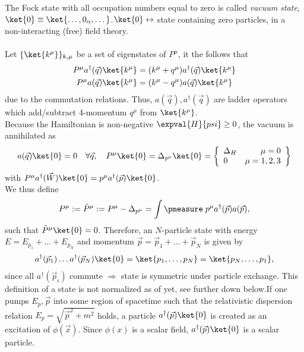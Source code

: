 The Fock state with all occupation numbers equal to zero is called \emph{vacuum state}, $\ket{0}\equiv \ket{\dots,0_{\alpha}, \dots}$.$\ket{0}\leftrightarrow$ state containing zero particles, in a non-interacting (free) field theory.\\
\\
Let $\{\ket{k^{\mu}}\}_{k,\mu}$ be a set of eigenstates of $P^{\mu}$, it the follows that
\begin{align}
	P^{\mu} a^{\dagger}(\vec{q}) \ket{k^{\mu}} &= (k^{\mu}+q^{\mu}) a^{\dagger}(\vec{q}) \ket{k^{\mu}}\\
	P^{\mu} a(\vec{q}) \ket{k^{\mu}} &= (k^{\mu}-q^{\mu}) a(\vec{q}) \ket{k^{\mu}}
\end{align}
due to the commutation relations. Thus, $a(\vec{q}),a^{\dagger}(\vec{q})$ are ladder operators which add/subtract 4-momentum $q^{\mu}$ from $\ket{k^{\mu}}$.\\
Because the Hamiltonian is non-negative $\expval{H}{psi} \geq 0$, the vacuum is annihilated as
\begin{equation}
	a(\vec{q}) \ket{0} = 0 \quad \forall \vec{q}, \quad P^{\mu} \ket{0}=\Delta_{p^{\mu}} \ket{0} = \left\{\begin{array}{lr}
	\Delta_H & \mu=0 \\
	0 & \mu =1,2,3 
	\end{array}		\right\}
\end{equation}
with $P^{\mu} a^{\dagger}(\vec{W})\ket{0}=p^{\mu} a^{\dagger}(\vec{p})\ket{0}$.\\
We thus define
\begin{equation}
	P^{\mu} := \tilde{P}^{\mu} := P^{\mu} - \Delta_{p^{\mu}} = \int \pmeasure \; p^{\mu} a^{\dagger}(\vec{p})a(\vec{p}),
\end{equation}
such that $\tilde{P}^{\mu} \ket{0}=0$.
Therefore, an $N$-particle state with energy $E=E_{p_1}+\dots+ E_{p_N}$ and momentum $\vec{p}=\vec{p}_1 +\dots + \vec{p}_N$ is given by 
\begin{equation}
	a^{\dagger}(\vec{p}_1)\dots a^{\dagger}(\vec{p}_N) \ket{0} = \ket{p_1,\dots,p_N} = \ket{p_N, \dots,p_1},
\end{equation}
since all $a^{\dagger}(\vec{p}_i)$ commute $\Rightarrow$ state is symmetric under particle exchange. This definition of a state is not normalized as of yet, see further down below.If one pumps $E_p,\vec{p}$ into some region of spacetime such that the relativistic dispersion relation $E_p = \sqrt{\vec{p}^2+m^2}$ holds, a particle $a^{\dagger}(\vec{p}) \ket{0}$ is created as an excitation of $\phi(\vec{x})$. Since $\phi(x)$ is a scalar field, $a^{\dagger}(\vec{p})\ket{0}$ is a scalar particle.
